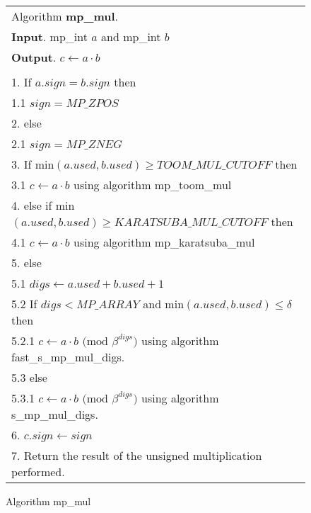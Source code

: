 \documentclass[b5paper]{book}
\begin{document}
\begin{figure}[!here]
\begin{small}
\begin{center}
\begin{tabular}{l}
\hline Algorithm \textbf{mp\_mul}. \\
\textbf{Input}.   mp\_int $a$ and mp\_int $b$ \\
\textbf{Output}.  $c \leftarrow a \cdot b$ \\
\hline \\
1.  If $a.sign = b.sign$ then \\
\hspace{3mm}1.1  $sign = MP\_ZPOS$ \\
2.  else \\
\hspace{3mm}2.1  $sign = MP\_ZNEG$ \\
3.  If min$(a.used, b.used) \ge TOOM\_MUL\_CUTOFF$ then  \\
\hspace{3mm}3.1  $c \leftarrow a \cdot b$ using algorithm mp\_toom\_mul \\
4.  else if min$(a.used, b.used) \ge KARATSUBA\_MUL\_CUTOFF$ then \\
\hspace{3mm}4.1  $c \leftarrow a \cdot b$ using algorithm mp\_karatsuba\_mul \\
5.  else \\
\hspace{3mm}5.1  $digs \leftarrow a.used + b.used + 1$ \\
\hspace{3mm}5.2  If $digs < MP\_ARRAY$ and min$(a.used, b.used) \le \delta$ then \\
\hspace{6mm}5.2.1  $c \leftarrow a \cdot b \mbox{ (mod }\beta^{digs}\mbox{)}$ using algorithm fast\_s\_mp\_mul\_digs.  \\
\hspace{3mm}5.3  else \\
\hspace{6mm}5.3.1  $c \leftarrow a \cdot b \mbox{ (mod }\beta^{digs}\mbox{)}$ using algorithm s\_mp\_mul\_digs.  \\
6.  $c.sign \leftarrow sign$ \\
7.  Return the result of the unsigned multiplication performed. \\
\hline
\end{tabular}
\end{center}
\end{small}
\caption{Algorithm mp\_mul}
\end{figure}
\end{document}
